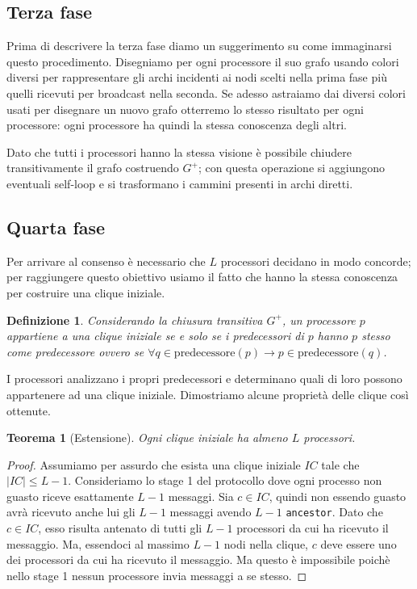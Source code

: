 \documentclass{article}
\newtheorem{definizione}{Definizione}
\newtheorem{teorema}{Teorema}
\begin{document}
\subsection{Terza fase}
Prima di descrivere la terza fase diamo un suggerimento su come immaginarsi questo procedimento. Disegniamo per ogni processore il suo grafo usando colori diversi per rappresentare gli archi incidenti ai nodi scelti nella prima fase più quelli ricevuti per broadcast nella seconda. Se adesso astraiamo dai diversi colori usati per disegnare un nuovo grafo otterremo lo stesso risultato per ogni processore: ogni processore ha quindi la stessa conoscenza degli altri.

Dato che tutti i processori hanno la stessa visione è possibile chiudere transitivamente il grafo costruendo $G^+$; con questa operazione si aggiungono eventuali self-loop e si trasformano i cammini presenti in archi diretti.

\subsection{Quarta fase}
Per arrivare al consenso è necessario che $L$ processori decidano in modo concorde; per raggiungere questo obiettivo usiamo il fatto che hanno la stessa conoscenza per costruire una clique iniziale. 
\begin{definizione}Considerando la chiusura transitiva $G^+$, un processore $p$ appartiene a una clique iniziale se e solo se i predecessori di $p$ hanno $p$ stesso come predecessore ovvero se $\forall q\in\mbox{predecessore}(p)\rightarrow p\in\mbox{predecessore}(q)$.\end{definizione}
I processori analizzano i propri predecessori e determinano quali di loro possono appartenere ad una clique iniziale. Dimostriamo alcune proprietà delle clique così ottenute.

\begin{teorema}[Estensione]Ogni clique iniziale ha almeno $L$ processori.\end{teorema}
\begin{proof}
Assumiamo per assurdo che esista una clique iniziale $IC$ tale che $|IC|\leq L-1$.
Consideriamo lo stage 1 del protocollo dove ogni processo non guasto riceve esattamente $L-1$ messaggi. Sia $c\in IC$, quindi non essendo guasto avrà ricevuto anche lui gli $L-1$ messaggi avendo $L-1$ \texttt{ancestor}. Dato che $c \in IC$, esso risulta antenato di tutti gli $L-1$ processori da cui ha ricevuto il messaggio. Ma, essendoci al massimo $L-1$ nodi nella clique, $c$ deve essere uno dei processori da cui ha ricevuto il messaggio. Ma questo è impossibile poichè nello stage 1 nessun processore invia messaggi a se stesso.
\end{proof}
\end{document}
